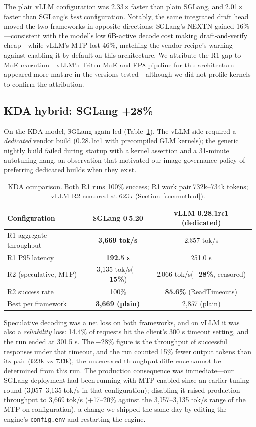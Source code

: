 \documentclass[11pt]{article}
\newcommand{\tps}{tok/s\xspace}
\begin{document}
The plain vLLM configuration was 2.33$\times$ faster than plain SGLang, and 2.01$\times$ faster than SGLang's \emph{best} configuration. Notably, the same integrated draft head moved the two frameworks in opposite directions: SGLang's NEXTN gained 16\%---consistent with the model's low 6B-active decode cost making draft-and-verify cheap---while vLLM's MTP lost 46\%, matching the vendor recipe's warning against enabling it by default on this architecture. We attribute the R1 gap to MoE execution---vLLM's Triton MoE and FP8 pipeline for this architecture appeared more mature in the versions tested---although we did not profile kernels to confirm the attribution.

\subsection{KDA hybrid: SGLang +28\%}
\label{sec:kda}

On the KDA model, SGLang again led (Table~\ref{tab:kda}). The vLLM side required a \emph{dedicated} vendor build (0.28.1rc1 with precompiled GLM kernels); the generic nightly build failed during startup with a kernel assertion and a 31-minute autotuning hang, an observation that motivated our image-governance policy of preferring dedicated builds when they exist.

\begin{table}[t]
\centering
\begin{tabular}{lcc}
\toprule
\textbf{Configuration} & \textbf{SGLang 0.5.20} & \textbf{vLLM 0.28.1rc1 (dedicated)} \\
\midrule
R1 aggregate throughput & \textbf{3,669 \tps} & 2,857 \tps \\
R1 P95 latency & \textbf{192.5 s} & 251.0 s \\
R2 (speculative, MTP) & 3,135 \tps (\textbf{$-$15\%}) & 2,066 \tps (\textbf{$-$28\%}, censored) \\
R2 success rate & 100\% & \textbf{85.6\%} (ReadTimeouts) \\
Best per framework & \textbf{3,669 (plain)} & 2,857 (plain) \\
\bottomrule
\end{tabular}
\caption{KDA comparison. Both R1 runs 100\% success; R1 work pair 732k--734k tokens; vLLM R2 censored at 623k (Section~\ref{sec:method}).}
\label{tab:kda}
\end{table}

Speculative decoding was a net loss on both frameworks, and on vLLM it was also a \emph{reliability} loss: 14.4\% of requests hit the client's 300 s timeout setting, and the run ended at 301.5 s. The $-$28\% figure is the throughput of successful responses under that timeout, and the run counted 15\% fewer output tokens than its pair (623k vs 733k); the uncensored throughput difference cannot be determined from this run. The production consequence was immediate---our SGLang deployment had been running with MTP enabled since an earlier tuning round (3,057--3,135 \tps{} in that configuration); disabling it raised production throughput to 3,669 \tps{} (+17--20\% against the 3,057--3,135 \tps{} range of the MTP-on configuration), a change we shipped the same day by editing the engine's \texttt{config.env} and restarting the engine.
\end{document}
